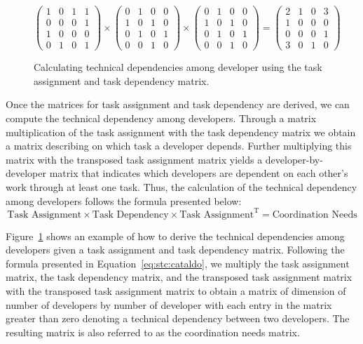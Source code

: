 \begin{figure}[t!]
\centering
\[
\left(
\begin{matrix}
1 & 0 & 1 & 1\\
0 & 0 & 0 & 1\\
1 & 0 & 0 & 0\\
0 & 1 & 0 & 1
\end{matrix}
\right)
\times
\left(
\begin{matrix}
0 & 1 & 0 & 0\\
1 & 0 & 1 & 0\\
0 & 1 & 0 & 1\\
0 & 0 & 1 & 0
\end{matrix}
\right)
\times
\left(
\begin{matrix}
0 & 1 & 0 & 0\\
1 & 0 & 1 & 0\\
0 & 1 & 0 & 1\\
0 & 0 & 1 & 0
\end{matrix}
\right)
=
\left(
\begin{matrix}
2 & 1 & 0 & 3\\
1 & 0 & 0 & 0\\
0 & 0 & 0 & 1\\
3 & 0 & 1 & 0
\end{matrix}
\right)
\]
\caption{Calculating technical dependencies among developer using the task assignment and task dependency matrix.}
\label{chap:3:fig:example:stc:cataldo}
\end{figure}
Once the matrices for task assignment and task dependency are derived, we can compute the technical dependency among developers.
Through a matrix multiplication of the task assignment with the task dependency matrix we obtain a matrix describing on which task a developer depends.
Further multiplying this matrix with the transposed task assignment matrix yields a developer-by-developer matrix that indicates which developers are dependent on each other's work through at least one task. 
%
Thus, the calculation of the technical dependency among developers follows the formula presented below:
\begin{equation}
\label{eq:stc:cataldo}
\text{Task Assignment} \times \text{Task Dependency} \times \text{Task Assignment}^{\text{T}} = \text{Coordination Needs}
\end{equation}

Figure~\ref{chap:3:fig:example:stc:cataldo} shows an example of how to derive the technical dependencies among developers given a task assignment and task dependency matrix.
Following the formula presented in Equation~\ref{eq:stc:cataldo}, we multiply the task assignment matrix, the task dependency matrix, and the transposed task assignment matrix with the transposed task assignment matrix to obtain a matrix of dimension of number of developers by number of developer with each entry in the matrix greater than zero denoting a technical dependency between two developers.
The resulting matrix is also referred to as the coordination needs matrix.


